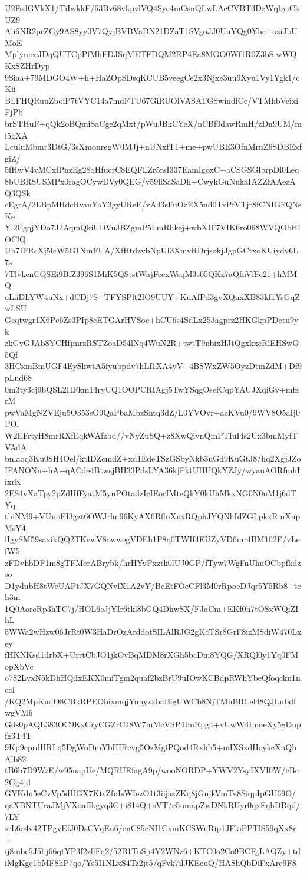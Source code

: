 U2FsdGVkX1/TiIwkkF/63Bv68vkpvlVQ4Sye4mOsnQLwLAeCVBT3DzWqbyiCkUZ9
Ali6NR2prZGy9AS8yy0V7QyjBVBVaDN21DZaT1SVgoJJ0UuYQg0Yhc+oziJbUMoE
MplymeeJDqQUTCpPfMhFDJSqMETFDQM2RP4Ea8MGO0Wf1R0Z3bSiwWQKxSZHrDyp
9Siaa+79MDGO4W+h+HaZOpSDsqKCUB5veegCe2x3Njxe3uu6Xyu1Vy1Ygk1/cKii
BLFHQRuuZboiP7tVYC14a7mdFTU67GiRUOlVASATGSwindlCc/VTMhbVeixiFjPb
brSTHuF+qQk2oBQmiSaCge2qMxt/pWuJBkCYeX/nCBf0dawRmH/zDn9UM/mi5gXA
LculuMbmr3DtG/3sXmonregW0MJj+nUNxfT1+me+pwUBE3OfnMrnZ6SDBExfgiZ/
5fHwV4vMCxfPnzEg28qHfucrC8EQFLZr5rsI337EamIgoxC+aCSGSGlbrpDl0Leq
8bUBRSUSMPx0ragOCywDVy0QEG/v59llSaSaDh+CwykGuNukaIAZZfAAezAQ3QSk
cEgrA/2LBpMHdcRvanYaY3gyUReE/vA43sFuOzEX5ud0TxPfVTjr8fCNIGFQNsKe
Yl2EgqjYDo7J2AqmQkiUDVuJBZgmP5LmRhkej+wbXIF7VIK6ro068WVQObHIOClQ
Ub7IFRcXj5lcW5G1NmFUA/XfHtdzvbNpUI3XmvRDrjsokjJgpGCtxoKUiydv6L7s
7TlvkenCQSEi9BfZ396S1MiK5QStstWajFccxWsqM3s05QKz7aQfnVfFc21+hMMQ
oLiiDLYW4uNx+dCDj7S+TFYSPlt2IO9UUY+KuAfPd3gvXQnxXB83kf1YsGqZwLSU
Gcqtwgr1X6Pc6Zs3PIp8eETGArHVSoc+hCU6s4SdLx253agprz2HKGkpPDetu9yk
zkGvGJAb8YCHfjmrzRSTZoaD54lNq4WuN2R+twtT9nbixHJtQgxkxeRlEHSwO5Qf
3HCxmBmUGF4EySkwtA5fyubpdv7hLf1XA4yV+4BSWxZW5OyzDtmZdM+Df9pLud68
0m3ty3cj9bQSL2IIFkm14ryUQ1OOPCRIAgj5TwYSqgOsefCqpYAUJXqiGv+mfzrM
pwVaMgNZVEju5O353sO9QaPbaMbzSntq3dZ/L0YVOvr+aeKVu0/9WV8O5aIj0POl
W2EFrtyH8mrRXfEqkWAfzbd//vNyZuSQ+z8XwQivnQmPTIuI4s2Ux3bmMyfTVAdA
bnlaoq3Ku0SH4Oel/ktIDZcmdZ+xd1EdeTSzGSbyNkb3uGd9KuGtJ8/hq2XgjJZo
IFANONn+hA+qACde4BtwsjBH33PdsLYA36kjFktUHUQkYZJy/wyauAORfmhIixrK
2ES4vXaTpy2pZdHfFyatM5yuPOtadzIcIEorIMteQkY0kUhMkxNG0N0uM1j6dTYq
tbiNM9+VUuoEI3gzt6OWJrlm96KyAX6RflnXnxRQphJYQNhIdZGLpkxRmXupMsY4
iIgySM59saxikQQ2TKvwV8owwegVDEh1P8q0TWIf4EUZyVD6mr4BM102E/vLefW5
zFDvhbDF1m8gTFMerABrybk/hrHYvPxztk0lUJ0GP/fTyw7WgFnUhuOCbpfkdzso
D1ydubH8tWcUAPtJX7GQNvlX1A2vY/BeEtFOcCFl3M0rRpoeDJqr5Y5Rb8+tch3m
1Q0AoreRp3hTC7j/HOL6eJjYIr6tkl8bGQ4DhwSX/FJaCm+EKf0h7tOSxWQiZIhL
5WWa2wHzw06JrRt0W3HaDrOzArddotSILAlRJG2gKcTSr8GrF8izMSdiW470Lxey
fHKNKsd1drbX+UrrtCbJO1jkOvBqMDM8rXGh5bcDm8YQG/XRQl0y1Yq0FMopXbVc
o782LvxN5kDhHQdxEKX0mfTgm2quaf2bzBrU9uIOwKCBdpRWhYbeQfoqckn1nccI
/KQ2MpKudO8CBkRPEObixmqjYnnyzxbaBigUWCb8NjTMhBRLel48QJLubdfwgVM6
Gds0pAQL383OC9KxCryCGZrC18W7mMcVSP4ImRpg4+vUwW4ImoeXy5gDupfg3T4T
9Kp9cprdHRLq5DgWoDmYbHIRcvg5OzMgiPQod4Rxhb5+mIXSxdHoykcXnQbAlb82
tB6b7D9WzE/w95napUe/MQRUEfagA9p/wooNORDP+YWV2YsyIXVI0W/cBc2Gg4jd
GYKdn5eCvVp5dUGX7KtsZfuIsWIezO1t3iijasZKq8jGnjkVmTv8SiqpIpGU69O/
qaXBNTUraJMjVXoafIkgyq3C+i814Q+sVT/e5umapZwDNkRUyr0qxFqhDRqd/7LY
srL6o4v42TPgvEfJ0DsCVqEn6/cnC85cNI1CxmKCSWuRip1JFkiPPTlS59qXx8r+
ij8mbe5J5bj66qtYP3f2zllFq2/52B1TuSp4Y2WNz6+KTC0o2Co9BCFgLAQZy+td
iMgKgc1bMF8hP7qo/Ys5I1NLxS4Tz2jt5/qFvk7ilJKEcuQ/HAShQbDiFxArc9F8
